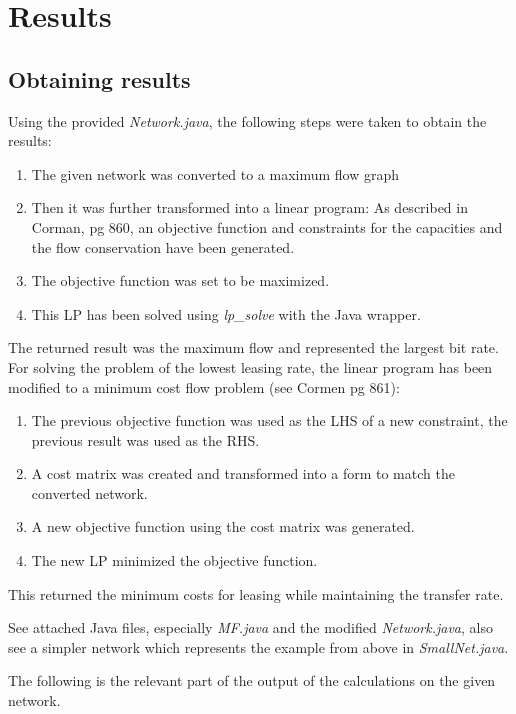 \documentclass{article}
\begin{document}
\section*{Results}
\subsection*{Obtaining results}
Using the provided \emph{Network.java}, the following steps were taken to obtain the results:
\begin{enumerate}
\item The given network was converted to a maximum flow graph
\item Then it was further transformed into a linear program: As described in Corman, pg 860, an objective function and constraints for the capacities and the flow conservation have been generated.
\item The objective function was set to be maximized.
\item This LP has been solved using \emph{lp\_solve} with the Java wrapper. 
\end{enumerate}
The returned result was the maximum flow and represented the largest bit rate. For solving the problem of the lowest leasing rate, the linear program has been modified to a minimum cost flow problem (see Cormen pg 861):
\begin{enumerate}
\item The previous objective function was used as the LHS of a new constraint, the previous result was used as the RHS.
\item A cost matrix was created and transformed into a form to match the converted network.
\item A new objective function using the cost matrix was generated.
\item The new LP minimized the objective function.
\end{enumerate}
This returned the minimum costs for leasing while maintaining the transfer rate. 

See attached Java files, especially \emph{MF.java} and the modified \emph{Network.java}, also see a simpler network which represents the example from above in \emph{SmallNet.java}. 

The following is the relevant part of the output of the calculations on the given network.
\end{document}
